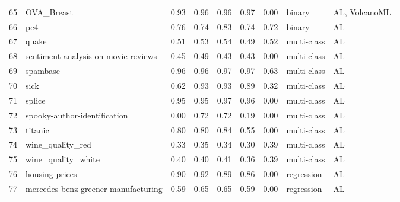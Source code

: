 \begin{table*}
\begin{tabular}{lllllllll}
65 & OVA\_Breast                                 & 0.93 & 0.96 & 0.96 & 0.97 & 0.00 & binary      & AL, VolcanoML    \\
66 & pc4                                         & 0.76 & 0.74 & 0.83 & 0.74 & 0.72 & binary      & AL               \\
67 & quake                                       & 0.51 & 0.53 & 0.54 & 0.49 & 0.52 & multi-class & AL               \\
68 & sentiment-analysis-on-movie-reviews         & 0.45 & 0.49 & 0.43 & 0.43 & 0.00 & multi-class & AL               \\
69 & spambase                                    & 0.96 & 0.96 & 0.97 & 0.97 & 0.63 & multi-class & AL               \\
70 & sick                                        & 0.62 & 0.93 & 0.93 & 0.89 & 0.32 & multi-class & AL               \\
71 & splice                                      & 0.95 & 0.95 & 0.97 & 0.96 & 0.00 & multi-class & AL               \\
72 & spooky-author-identification                & 0.00 & 0.72 & 0.72 & 0.19 & 0.00 & multi-class & AL               \\
73 & titanic                                     & 0.80 & 0.80 & 0.84 & 0.55 & 0.00 & multi-class & AL               \\
74 & wine\_quality\_red                          & 0.33 & 0.35 & 0.34 & 0.30 & 0.39 & multi-class & AL               \\
75 & wine\_quality\_white                        & 0.40 & 0.40 & 0.41 & 0.36 & 0.39 & multi-class & AL               \\
76 & housing-prices                              & 0.90 & 0.92 & 0.89 & 0.86 & 0.00 & regression  & AL               \\
77 & mercedes-benz-greener-manufacturing         & 0.59 & 0.65 & 0.65 & 0.59 & 0.00 & regression  & AL    \\
\bottomrule
\end{tabular}

\label{tab:detailed_scores}
\end{table*}

